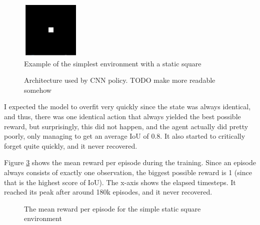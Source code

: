 \documentclass[
  digital,     %
  oneside,     %
  nosansbold,  %
  nocolorbold, %
  lof,         %
  lot,         %
]{fithesis4}
\begin{document}
\begin{figure}
    \includegraphics[width=0.5\linewidth]{env_examples/env0.png}
    \caption{Example of the simplest environment with a static square}
    \label{fig:env0}
\end{figure}

\begin{figure}
    \caption{Architecture used by CNN policy. TODO make more readable somehow}
    \label{fig:cnn_policy}
\end{figure}

I expected the model to overfit very quickly since the state was always identical, and thus, there was one identical action that always yielded the best possible reward, but surprisingly, this did not happen, and the agent actually did pretty poorly, only managing to get an average IoU of 0.8. It also started to critically forget quite quickly, and it never recovered.

Figure \ref{fig:v0_rew} shows the mean reward per episode during the training. Since an episode always consists of exactly one observation, the biggest possible reward is 1 (since that is the highest score of IoU). The x-axis shows the elapsed timesteps. It reached its peak after around 180k episodes, and it never recovered.

\begin{figure}
    \centering
    \makebox[\textwidth][c]{}
    \caption{The mean reward per episode for the simple static square environment}
    \label{fig:v0_rew}
\end{figure}
\end{document}
